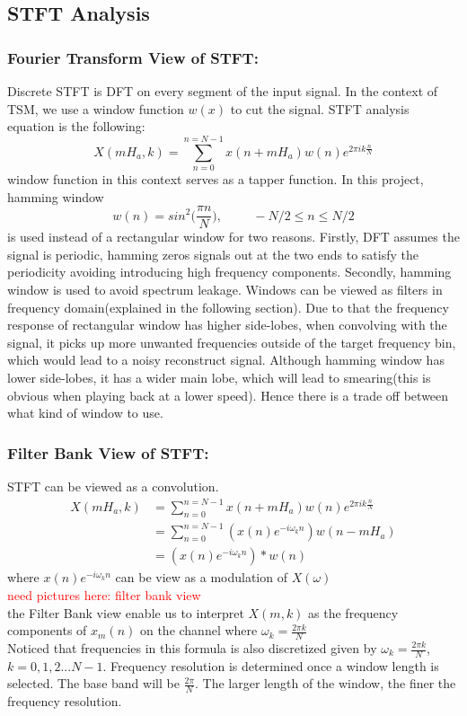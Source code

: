 \documentclass{article}
\begin{document}
\subsection{STFT Analysis}
\subsubsection{Fourier Transform View of STFT:}
Discrete STFT is DFT on every segment of the input signal. In the context of TSM, we use a window function $w(x)$ to cut the signal. STFT analysis equation is the following:
\begin{equation}
        X(mH_a,k) = \sum_{n=0}^{n= N-1} x(n+mH_a) w(n) e^{2 \pi ik \frac{n}{N}} 
\end{equation}
window function in this context serves as a tapper function. In this project, hamming window 
\[
w(n) = sin^2\bigg(\frac{\pi n}{N} \bigg), \hspace{1cm} -N/2 \leq n \leq N/2
\]
is used instead of a rectangular window for two reasons. Firstly, DFT assumes the signal is periodic, hamming zeros signals out at the two ends to satisfy the periodicity avoiding introducing high frequency components. Secondly, hamming window is used to avoid spectrum leakage. Windows can be viewed as filters in frequency domain(explained in the following section). Due to that the frequency response of rectangular window has higher side-lobes, when convolving with the signal, it picks up more unwanted frequencies outside of the target frequency bin, which would lead to a noisy reconstruct signal. Although hamming window has lower side-lobes, it has a wider main lobe, which will lead to smearing(this is obvious when playing back at a lower speed). Hence there is a trade off between what kind of window to use.
\subsubsection{Filter Bank View of STFT:}
STFT can be viewed as a convolution.\\ 
\[
        \begin{aligned}
        X(mH_a,k) &= \sum_{n=0}^{n= N-1} x(n+mH_a) w(n) e^{2 \pi ik \frac{n}{N}}\\ 
                  &=\sum_{n=0}^{n=N-1}(x(n)e^{-i\omega_k n})w(n-mH_a)\\
                  &=  (x(n) e^{-i\omega_k n} )* w(n)
\end{aligned}
\]
where  $x(n) e^{-i\omega_k n}$ can be view as a modulation of $X(\omega)$\\
\textcolor{red}{need pictures here: filter bank view}\\
the Filter Bank view enable us to interpret $X(m,k)$ as the frequency components of $x_m(n)$ on the channel where $\omega_k=\frac{2\pi k}{N}$ \\ 
Noticed that frequencies in this formula is also discretized given by $\omega_{k} = \frac{2\pi k}{N}$, $k=0,1,2...N-1$. Frequency resolution is determined once a window length is selected. The base band will be $\frac{2\pi}{N}$. The larger length of the window, the finer the frequency resolution. 
\end{document}
